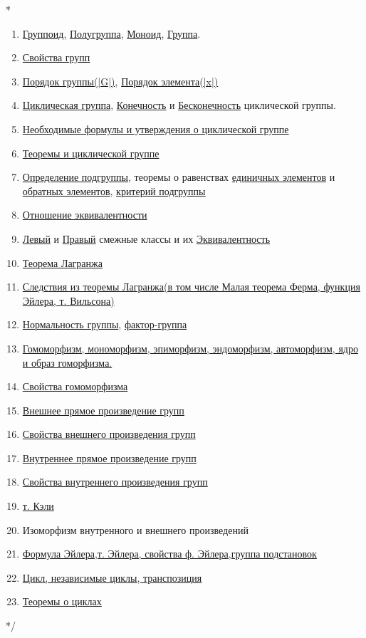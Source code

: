 \documentclass[12pt]{article}
\begin{document}
	\/*	\begin{enumerate}
			\item \hyperlink{indef:gruppoid}{Группоид}, \hyperlink{indef:halfgroup}{Полугруппа}, \hyperlink{indef:monoid}{Моноид}, \hyperlink{indef:group}{Группа}.
			\item \hyperlink{inpro:group}{Свойства групп}
			\item \hyperlink{indef:por_group}{Порядок группы(|G|)}, \hyperlink{indef:kpor_el}{Порядок элемента(|x|)}
			\item \hyperlink{indef:circle_group}{Циклическая группа}, \hyperlink{indef:inf_circle_group}{Конечность} и \hyperlink{indef:noninf_circle_gtoup}{Бесконечность} циклической группы.
			\item \hyperlink{f:circle}{Необходимые формулы и утверждения о циклической группе}
			\item \hyperlink{th:circle}{Теоремы и циклической группе}
			\item \hyperlink{indef_subgroup}{Определение подгруппы}, теоремы о равенствах \hyperlink{th:subgrop_e}{единичных элементов} и \hyperlink{th:subgroup_-1}{обратных элементов}, \hyperlink{th_subgroup_cri}{критерий подгруппы}
			\item \hyperlink{indef:equiv}{Отношение эквивалентности}
			\item \hyperlink{indef:left_class}{Левый} и \hyperlink{indef:right_class}{Правый} смежные классы и их \hyperlink{th:class-equiv}{Эквивалентность}
			\item \hyperlink{t_lang}{Теорема Лагранжа}
			\item \hyperlink{sl:t_lang}{Следствия из теоремы Лагранжа(в том числе Малая теорема Ферма, функция Эйлера, т. Вильсона)}
			\item \hyperlink{indef:norm_gr}{Нормальность группы}, \hyperlink{indef:fact_gr}{фактор-группа}
			\item \hyperlink{indef:morfizm}{Гомоморфизм, мономорфизм, эпиморфизм, эндоморфизм, автоморфизм, ядро и образ гоморфизма.}
			\item \hyperlink{inpro:gom}{Свойства гомоморфизма}
			\item \hyperlink{def:comp}{Внешнее прямое произведение групп}
			\item \hyperlink{inpro:out_comp}{Свойства внешнего произведения групп}
			\item \hyperlink{def:in_comp}{Внутреннее прямое произведение групп} 
			\item \hyperlink{inpro:in_comp}{Свойства внутреннего произведения групп}
			\item \hyperlink{th:keli}{т. Кэли}
			\item Изоморфизм внутренного и внешнего произведений
			\item \hyperlink{el}{Формула Эйлера,т. Эйлера, свойства ф. Эйлера,группа подстановок}
			\item \hyperlink{def:while}{Цикл, независимые циклы, транспозиция}
			\item \hyperlink{th:while}{Теоремы о циклах}
			\end{enumerate} */
\end{document}

